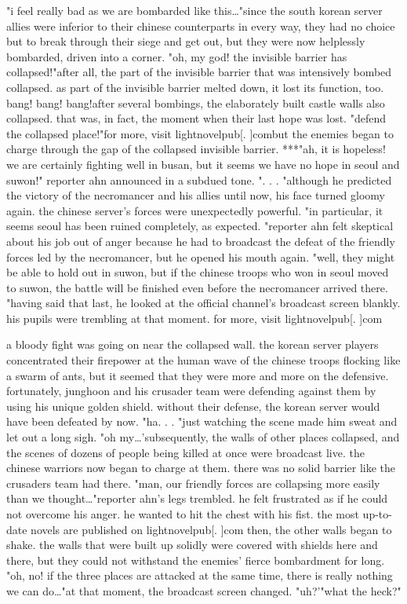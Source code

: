 "i feel really bad as we are bombarded like this…"since the south korean server allies were inferior to their chinese counterparts in every way, they had no choice but to break through their siege and get out, but they were now helplessly bombarded, driven into a corner.
"oh, my god! the invisible barrier has collapsed!"after all, the part of the invisible barrier that was intensively bombed collapsed.
 as part of the invisible barrier melted down, it lost its function, too.
 bang! bang! bang!after several bombings, the elaborately built castle walls also collapsed.
that was, in fact, the moment when their last hope was lost.
"defend the collapsed place!"for more, visit lightnovelpub[.
]combut the enemies began to charge through the gap of the collapsed invisible barrier.
***"ah, it is hopeless! we are certainly fighting well in busan, but it seems we have no hope in seoul and suwon!" reporter ahn announced in a subdued tone.
".
.
.
"although he predicted the victory of the necromancer and his allies until now, his face turned gloomy again.
 the chinese server's forces were unexpectedly powerful.
"in particular, it seems seoul has been ruined completely, as expected.
"reporter ahn felt skeptical about his job out of anger because he had to broadcast the defeat of the friendly forces led by the necromancer, but he opened his mouth again.
"well, they might be able to hold out in suwon, but if the chinese troops who won in seoul moved to suwon, the battle will be finished even before the necromancer arrived there.
"having said that last, he looked at the official channel's broadcast screen blankly.
 his pupils were trembling at that moment.
for more, visit lightnovelpub[.
]com

a bloody fight was going on near the collapsed wall.
 the korean server players concentrated their firepower at the human wave of the chinese troops flocking like a swarm of ants, but it seemed that they were more and more on the defensive.
fortunately, junghoon and his crusader team were defending against them by using his unique golden shield.
 without their defense, the korean server would have been defeated by now.
"ha.
.
.
"just watching the scene made him sweat and let out a long sigh.
"oh my…'subsequently, the walls of other places collapsed, and the scenes of dozens of people being killed at once were broadcast live.
 the chinese warriors now began to charge at them.
 there was no solid barrier like the crusaders team had there.
"man, our friendly forces are collapsing more easily than we thought…"reporter ahn's legs trembled.
 he felt frustrated as if he could not overcome his anger.
 he wanted to hit the chest with his fist.
the most up-to-date novels are published on lightnovelpub[.
]com then, the other walls began to shake.
 the walls that were built up solidly were covered with shields here and there, but they could not withstand the enemies' fierce bombardment for long.
"oh, no! if the three places are attacked at the same time, there is really nothing we can do…"at that moment, the broadcast screen changed.
 "uh?'"what the heck?"

 